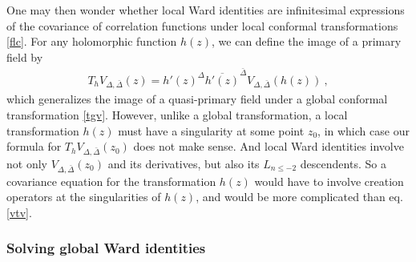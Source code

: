 \documentclass[12pt, a4paper, notitlepage, twoside]{report}
\numberwithin{equation}{section}
\theoremstyle{break}
\begin{document}
One may then wonder whether local Ward identities are infinitesimal expressions of the covariance of correlation functions under local conformal transformations \eqref{flc}.
For any holomorphic function $h(z)$, we can define the image of a primary field by
\begin{align}
 T_h V_{\Delta,\bar\Delta}(z) = h'(z)^{\Delta}\overline{h'(z)}^{\bar \Delta}V_{\Delta,\bar\Delta}(h(z))\ ,
\label{thv}
\end{align}
which generalizes the image of a quasi-primary field under a global conformal transformation \eqref{tgv}.
However, unlike a global transformation, a local transformation $h(z)$ must have a singularity at some point $z_0$, in which case our formula for $T_hV_{\Delta,\bar\Delta}(z_0)$ does not make sense. And local Ward identities involve not only $V_{\Delta,\bar\Delta}(z_0)$ and its derivatives, but also its $L_{n\leq -2}$ descendents.
So a covariance equation for the transformation $h(z)$ would have to involve creation operators at the singularities of $h(z)$, and would be more complicated than eq. \eqref{vtv}.


\subsubsection{Solving global Ward identities}
\end{document}
